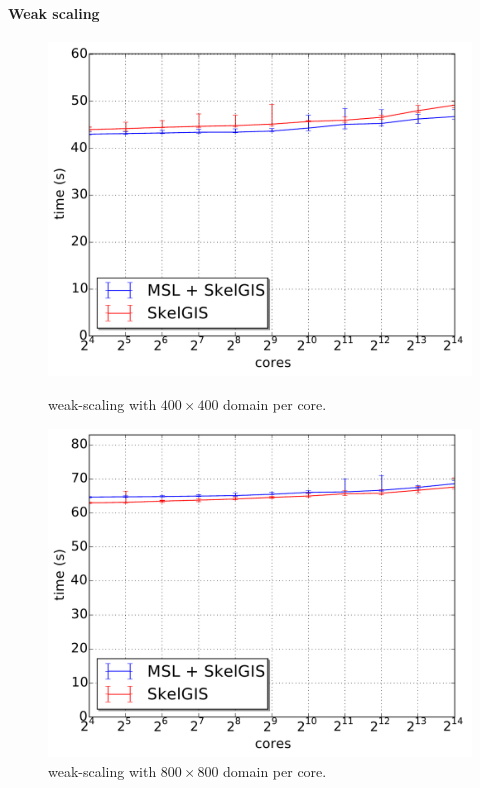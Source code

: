 \paragraph{\textbf{Weak scaling}}
\begin{figure}[t]
\begin{minipage}{.475\textwidth}
  \includegraphics[width=\textwidth]{../results/weak_scaling/400/median_weak.pdf}
  \caption{weak-scaling with $400 \times 400$ domain per core.}
  \label{fig:weak1}
\end{minipage}
\hfill
\begin{minipage}{.475\textwidth}
  \includegraphics[width=\textwidth]{../results/weak_scaling/800/median_weak.pdf}
  \caption{weak-scaling with $800 \times 800$ domain per core.}
  \label{fig:weak2}
\end{minipage}\end{figure}
